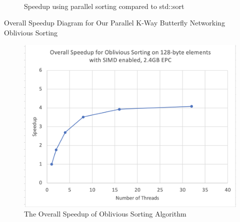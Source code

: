 \documentclass[final,hyperref={pdfpagelabels=false}]{beamer}
\begin{document}
\begin{frame}
\begin{columns}[t]
\begin{column}{.30\linewidth}
\begin{figure}[h]
\begin{minipage}{0.48\linewidth}
            \caption{Speedup using parallel sorting compared to std::sort}
        \end{minipage} \\ \\  \\
    \end{figure}
    \vspace{50}
    \begin{block}{Overall Speedup Diagram for Our Parallel K-Way Butterfly Networking Oblivious Sorting}
    \end{block}
    \begin{figure}
      \includegraphics[width=0.8\linewidth]{assets/overall.png}
      \caption{The Overall Speedup of Oblivious Sorting Algorithm}
    \end{figure}

  \end{column}
  


\end{columns}
\end{frame}
\end{document}
